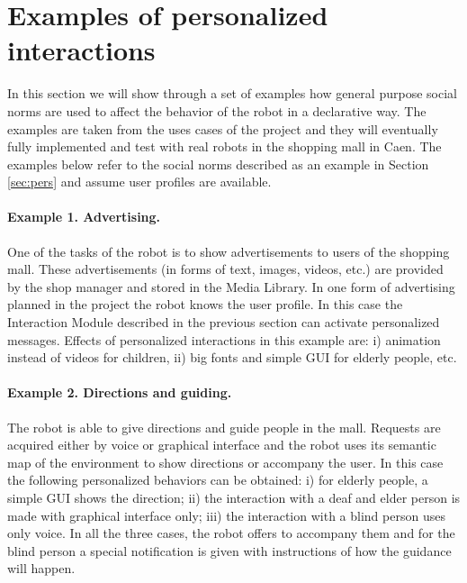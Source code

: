 \section{Examples of personalized interactions}


In this section we will show through a set of examples how general purpose social norms are used to affect the behavior of the robot in a declarative way. The examples are taken from the uses cases of the \coaches project and they will eventually fully implemented and test with real robots in the shopping mall in Caen. The examples below refer to the social norms described as an example in Section \ref{sec:pers} and assume user profiles are available.



\paragraph{Example 1. Advertising.} One of the tasks of the \coaches robot is to show advertisements to users of the shopping mall. These advertisements (in forms of text, images, videos, etc.) are provided by the shop manager and stored in the Media Library. 
In one form of advertising planned in the project the robot knows the user profile. In this case the Interaction Module described in the previous section can activate personalized messages.
Effects of personalized interactions in this example are: i) animation instead of videos for children, ii) big fonts and simple GUI for elderly people, etc. 

\paragraph{Example 2. Directions and guiding.} The robot is able to give directions and guide people in the mall. Requests are acquired either by voice or graphical interface and the robot uses its semantic map of the environment to show directions or accompany the user. In this case the following personalized behaviors can be obtained: i) for elderly people, a simple GUI shows the direction; ii) the interaction with a deaf and elder person is made with graphical interface only; iii) the interaction with a blind person uses only voice. In all the three cases, the robot offers to accompany them and for the blind person a special notification is given with instructions of how the guidance will happen.

